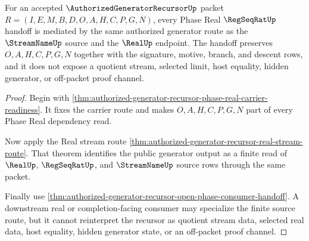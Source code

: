 \begin{theorem}
\label{thm:authorized-generator-recursor-phase-real-regseqrat-handoff}
For an accepted $\AuthorizedGeneratorRecursorUp$ packet $R=(I,E,M,B,D,O,A,H,C,P,G,N)$, every Phase Real $\RegSeqRatUp$ handoff is mediated by the same authorized generator route as the $\StreamNameUp$ source and the $\RealUp$ endpoint. The handoff preserves $O,A,H,C,P,G,N$ together with the signature, motive, branch, and descent rows, and it does not expose a quotient stream, selected limit, host equality, hidden generator, or off-packet proof channel.
\end{theorem}
\begin{proof}
Begin with \autoref{thm:authorized-generator-recursor-phase-real-carrier-readiness}. It fixes the carrier route and makes $O,A,H,C,P,G,N$ part of every Phase Real dependency read.

Now apply the Real stream route \autoref{thm:authorized-generator-recursor-real-stream-route}. That theorem identifies the public generator output as a finite read of $\RealUp$, $\RegSeqRatUp$, and $\StreamNameUp$ source rows through the same packet.

Finally use \autoref{thm:authorized-generator-recursor-open-phase-consumer-handoff}. A downstream real or completion-facing consumer may specialize the finite source route, but it cannot reinterpret the recursor as quotient stream data, selected real data, host equality, hidden generator state, or an off-packet proof channel.
\end{proof}

